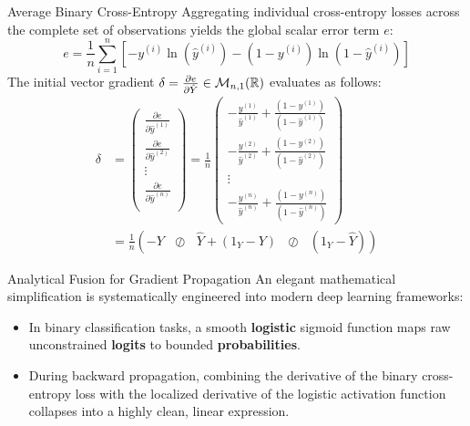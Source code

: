 \begin{frame}{Average Binary Cross-Entropy}
	Aggregating individual cross-entropy losses across the complete set of observations yields the global scalar error term $e$:
	\begin{equation*}
		e = \frac{1}{n} \sum_{i=1}^n \left[ - y^{(i)} \ln{\left(\hat{y}^{(i)}\right)} - \left(1 - y^{(i)}\right) \ln{\left(1 - \hat{y}^{(i)}\right)} \right]
	\end{equation*}
	\pause
	The initial vector gradient $\delta = \frac{\partial{e}}{\partial{\hat{Y}}} \in \mathcal{M}_{n,1}(\mathbb{R})$ evaluates as follows:
	\begin{equation*}
		\begin{aligned}
			\delta 
			&= 
			\begin{pmatrix}
				\frac{\partial{e}}{\partial{\hat{y}^{(1)}}} \\[5pt]
				\frac{\partial{e}}{\partial{\hat{y}^{(2)}}} \\[5pt]
				\vdots \\
				\frac{\partial{e}}{\partial{\hat{y}^{(n)}}} \\
			\end{pmatrix}
			= \frac{1}{n}
			\begin{pmatrix}
				-\frac{y^{(1)}}{\hat{y}^{(1)}} + \frac{\left(1 - y^{(1)}\right)}{\left(1 - \hat{y}^{(1)}\right)} \\[5pt]
				-\frac{y^{(2)}}{\hat{y}^{(2)}} + \frac{\left(1 - y^{(2)}\right)}{\left(1 - \hat{y}^{(2)}\right)} \\[5pt]
				\vdots \\
				-\frac{y^{(n)}}{\hat{y}^{(n)}} + \frac{\left(1 - y^{(n)}\right)}{\left(1 - \hat{y}^{(n)}\right)}
			\end{pmatrix} \\
			&= \frac{1}{n} \left( -Y \text{ } \oslash \text{ } \hat{Y} + \left(1_Y - Y\right) \text{ } \oslash \text{ } \left(1_Y - \hat{Y}\right)\right)
		\end{aligned}
	\end{equation*}
\end{frame}

\begin{frame}{Analytical Fusion for Gradient Propagation}
	An elegant mathematical simplification is systematically engineered into modern deep learning frameworks:
	\begin{itemize}
		\item In binary classification tasks, a smooth \textbf{logistic} sigmoid function maps raw unconstrained \textbf{logits} to bounded \textbf{probabilities}.
		\item During backward propagation, combining the derivative of the binary cross-entropy loss with the localized derivative of the logistic activation function collapses into a highly clean, linear expression.
	\end{itemize}
\end{frame}

